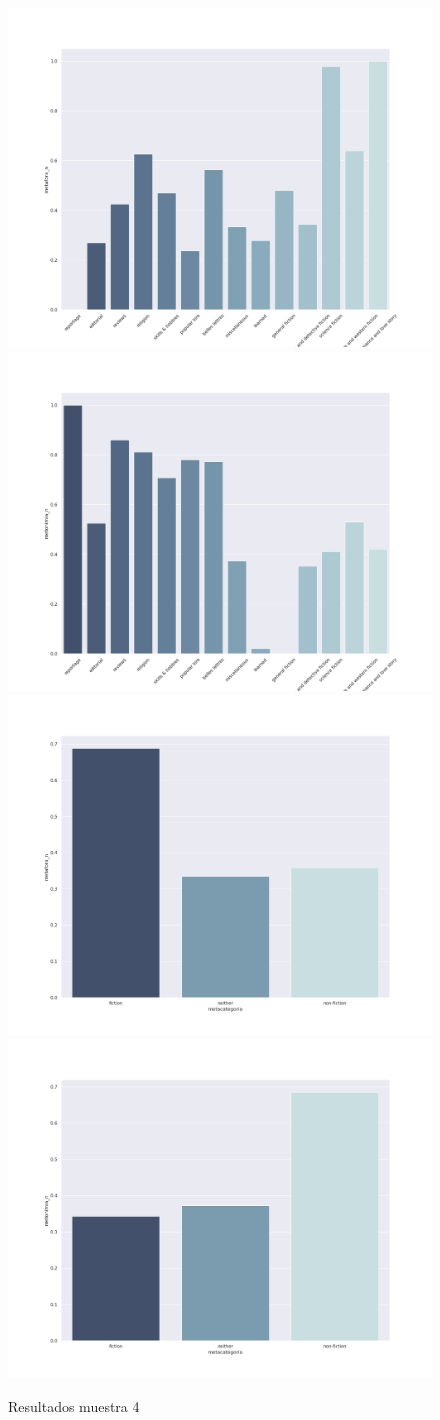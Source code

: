 \documentclass[12pt,letterpaper,twoside]{article}
\begin{document}
\begin{figure}[H]
\centering
\includegraphics[width=.45\linewidth]{./resultados/graphs/muestra/c4_metafora.png}
\includegraphics[width=.45\linewidth]{./resultados/graphs/muestra/c4_metonimia.png}
\includegraphics[width=.45\linewidth]{./resultados/graphs/meta/c4_metacategoria_metafora.png}
\includegraphics[width=.45\linewidth]{./resultados/graphs/meta/c4_metacategoria_metonimia.png}
\caption{\label{fig:c4_resultados}Resultados muestra 4}
\end{figure}
\end{document}
